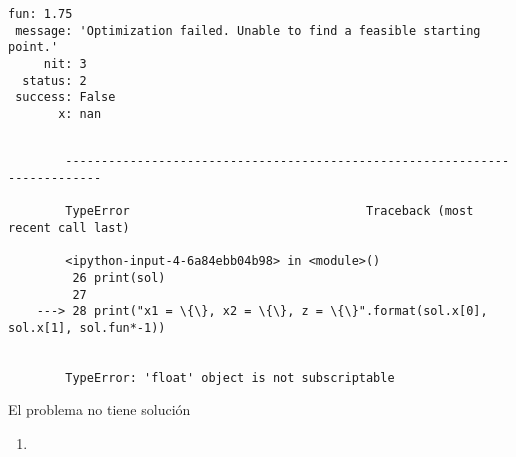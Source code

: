 \documentclass[11pt]{article}
\begin{document}
    \begin{Verbatim}[commandchars=\\\{\}]
     fun: 1.75
 message: 'Optimization failed. Unable to find a feasible starting point.'
     nit: 3
  status: 2
 success: False
       x: nan

    \end{Verbatim}

    \begin{Verbatim}[commandchars=\\\{\}]

        ---------------------------------------------------------------------------

        TypeError                                 Traceback (most recent call last)

        <ipython-input-4-6a84ebb04b98> in <module>()
         26 print(sol)
         27 
    ---> 28 print("x1 = \{\}, x2 = \{\}, z = \{\}".format(sol.x[0], sol.x[1], sol.fun*-1))
    

        TypeError: 'float' object is not subscriptable

    \end{Verbatim}

    El problema no tiene solución

    \begin{enumerate}
\def\labelenumi{\Alph{enumi})}
\setcounter{enumi}{3}
\item
\end{enumerate}
\end{document}
